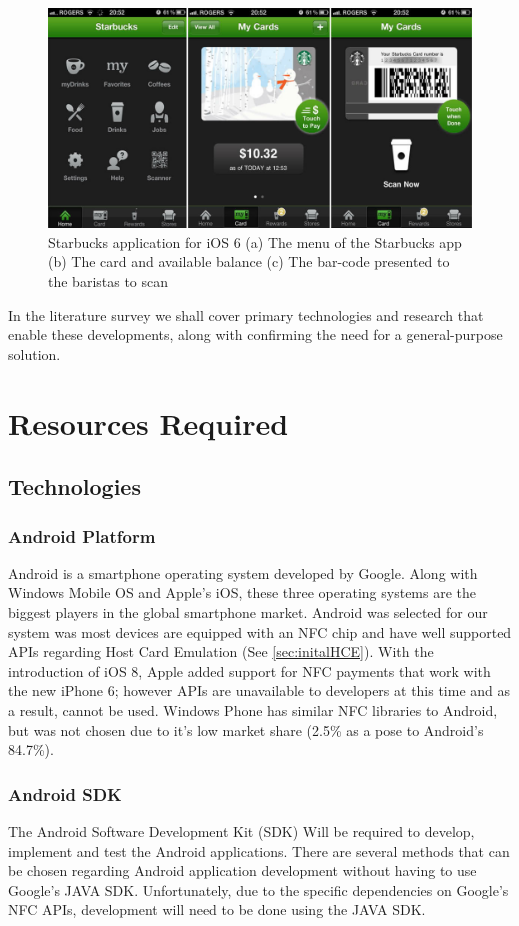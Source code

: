 \begin{figure}[h!]
  \centering
    \includegraphics[width=1\textwidth]{img/starbucks-image-2.jpeg}
      \caption{Starbucks application for iOS 6 (a) The menu of the Starbucks app (b) The card and available balance (c) The bar-code presented to the baristas to scan}
      \label{fig:starbucksios6}
\end{figure}

In the literature survey we shall cover primary technologies and research that enable these developments, along with confirming the need for a general-purpose solution.

\section{Resources Required}
\subsection{Technologies}
\subsubsection{Android Platform}
Android is a smartphone operating system developed by Google. Along with Windows Mobile OS and Apple's iOS, these three operating systems are the biggest players in the global smartphone market. Android was selected for our system was most devices are equipped with an NFC chip and have well supported APIs regarding Host Card Emulation (See \ref{sec:initalHCE}). With the introduction of iOS 8, Apple added support for NFC payments that work with the new iPhone 6; however APIs are unavailable to developers at this time and as a result, cannot be used. Windows Phone has similar NFC libraries to Android, but was not chosen due to it's low market share (2.5\% as a pose to Android's 84.7\%)\cite{marketShare}. 
\subsubsection{Android SDK}
The Android Software Development Kit (SDK) Will be required to develop, implement and test the Android applications. There are several methods that can be chosen regarding Android application development without having to use Google's JAVA SDK. Unfortunately, due to the specific dependencies on Google's NFC APIs, development will need to be done using the JAVA SDK.

